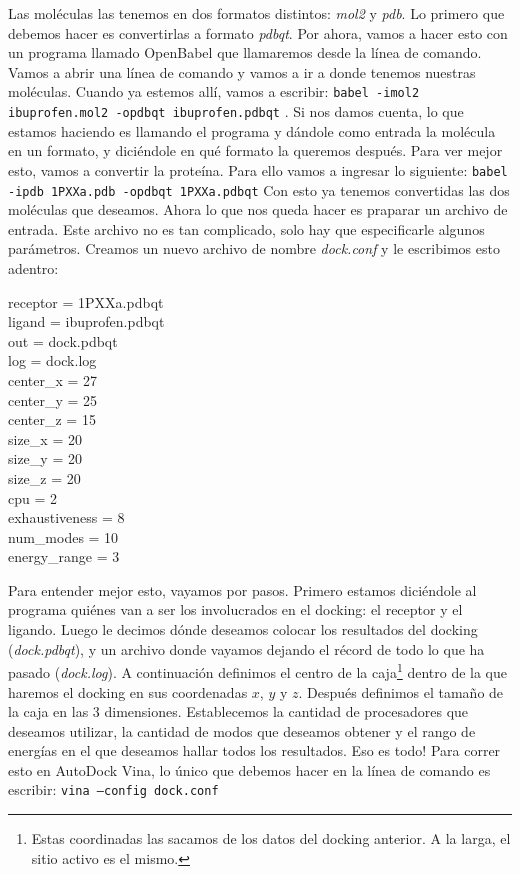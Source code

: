 \documentclass[10pt,letterpaper]{article}
\newcommand{\inlinecode}[1]{
\colorbox{light-gray}{\texttt{#1}}
}
\newenvironment{Code}
{
\begin{lrbox}{\selvestebox}%
\begin{minipage}{\dimexpr\columnwidth-2\fboxsep\relax}
\fontfamily{\ttdefault}\selectfont
}
{\end{minipage}\end{lrbox}%
\begin{center}
\colorbox{light-gray}{\usebox{\selvestebox}}
\end{center}
}
\begin{document}
Las mol\'eculas las tenemos en dos formatos distintos: \emph{mol2} y \emph{pdb}. Lo primero que debemos hacer es convertirlas a formato \emph{pdbqt}. Por ahora, vamos a hacer esto con un programa llamado OpenBabel que llamaremos desde la l\'inea de comando. Vamos a abrir una l\'inea de comando y vamos a ir a donde tenemos nuestras mol\'eculas. Cuando ya estemos all\'i, vamos a escribir: \inlinecode{babel -imol2 ibuprofen.mol2 -opdbqt ibuprofen.pdbqt}. Si nos damos cuenta, lo que estamos haciendo es llamando el programa y d\'andole como entrada la mol\'ecula en un formato, y dici\'endole en qu\'e formato la queremos despu\'es. Para ver mejor esto, vamos a convertir la prote\'ina. Para ello vamos a ingresar lo siguiente: \inlinecode{babel -ipdb 1PXXa.pdb -opdbqt 1PXXa.pdbqt} Con esto ya tenemos convertidas las dos mol\'eculas que deseamos. Ahora lo que nos queda hacer es praparar un archivo de entrada. Este archivo no es tan complicado, solo hay que especificarle algunos par\'ametros. Creamos un nuevo archivo de nombre \emph{dock.conf} y le escribimos esto adentro:

\begin{Code}
receptor = 1PXXa.pdbqt\\
ligand = ibuprofen.pdbqt\\
out = dock.pdbqt\\
log = dock.log\\
center\_x = 27\\
center\_y = 25\\
center\_z = 15\\
size\_x = 20\\
size\_y = 20\\
size\_z = 20\\
cpu = 2\\
exhaustiveness = 8\\
num\_modes = 10\\
energy\_range = 3
\end{Code}

Para entender mejor esto, vayamos por pasos. Primero estamos dici\'endole al programa qui\'enes van a ser los involucrados en el docking: el receptor y el ligando. Luego le decimos d\'onde deseamos colocar los resultados del docking (\emph{dock.pdbqt}), y un archivo donde vayamos dejando el r\'ecord de todo lo que ha pasado (\emph{dock.log}). A continuaci\'on definimos el centro de la caja\footnote{Estas coordinadas las sacamos de los datos del docking anterior. A la larga, el sitio activo es el mismo.} dentro de la que haremos el docking en sus coordenadas $x$, $y$ y $z$. Despu\'es definimos el tama\~no de la caja en las 3 dimensiones. Establecemos la cantidad de procesadores que deseamos utilizar, la cantidad de modos que deseamos obtener y el rango de energ\'ias en el que deseamos hallar todos los resultados. Eso es todo! Para correr esto en AutoDock Vina, lo \'unico que debemos hacer en la l\'inea de comando es escribir: \inlinecode{vina --config dock.conf}\\
\end{document}
